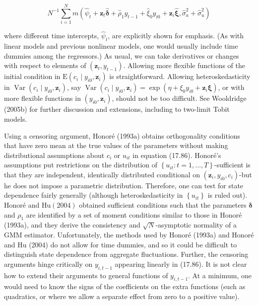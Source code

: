 \documentclass[10pt]{article}
\begin{document}
\begin{equation*}
N^{-1} \sum_{i=1}^{N} m\left(\hat{\psi}_{t}+\mathbf{z}_{t} \hat{\boldsymbol{\delta}}+\hat{\rho}_{1} y_{t-1}+\hat{\xi}_{0} y_{i 0}+\mathbf{z}_{i} \hat{\boldsymbol{\xi}}, \hat{\sigma}_{a}^{2}+\hat{\sigma}_{u}^{2}\right) \tag{17.90}
\end{equation*}


where different time intercepts, $\hat{\psi}_{t}$, are explicitly shown for emphasis. (As with linear models and previous nonlinear models, one would usually include time dummies among the regressors.) As usual, we can take derivatives or changes with respect to elements of $\left(\mathbf{z}_{t}, y_{t-1}\right)$. Allowing more flexible functions of the initial condition in $\mathrm{E}\left(c_{i} \mid y_{i 0}, \mathbf{z}_{i}\right)$ is straightforward. Allowing heteroskedasticity in $\operatorname{Var}\left(c_{i} \mid y_{i 0}, \mathbf{z}_{i}\right)$, say $\operatorname{Var}\left(c_{i} \mid y_{i 0}, \mathbf{z}_{i}\right)=\exp \left(\eta+\xi_{0} y_{i 0}+\mathbf{z}_{i} \boldsymbol{\xi}\right)$, or with more flexible functions in $\left(y_{i 0}, \mathbf{z}_{i}\right)$, should not be too difficult. See Wooldridge (2005b) for further discussion and extensions, including to two-limit Tobit models.

Using a censoring argument, Honoré (1993a) obtains orthogonality conditions that have zero mean at the true values of the parameters without making distributional assumptions about $c_{i}$ or $u_{i t}$ in equation (17.86). Honoré's assumptions put restrictions on the distribution of $\left\{u_{i t}: t=1, \ldots, T\right\}$-sufficient is that they are independent, identically distributed conditional on $\left(\mathbf{z}_{i}, y_{i 0}, c_{i}\right)$-but he does not impose a parametric distribution. Therefore, one can test for state dependence fairly generally (although heteroskedasticity in $\left\{u_{i t}\right\}$ is ruled out). Honoré and $\mathrm{Hu}(2004)$ obtained sufficient conditions such that the parameters $\boldsymbol{\delta}$ and $\rho_{1}$ are identified by a set of moment conditions similar to those in Honoré (1993a), and they derive the consistency and $\sqrt{N}$-asymptotic normality of a GMM estimator. Unfortunately, the methods used by Honoré (1993a) and Honoré and Hu (2004) do not allow for time dummies, and so it could be difficult to distinguish state dependence from aggregate fluctuations. Further, the censoring arguments hinge critically on $y_{i, t-1}$ appearing linearly in (17.86). It is not clear how to extend their arguments to general functions of $y_{i, t-1}$. At a minimum, one would need to know the signs of the coefficients on the extra functions (such as quadratics, or where we allow a separate effect from zero to a positive value).
\end{document}
